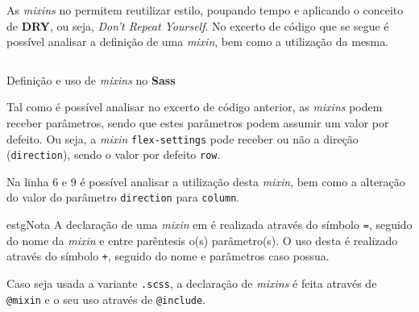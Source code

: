 
As \textit{mixins} no \textbf{} permitem reutilizar estilo, poupando tempo e aplicando o conceito de \textbf{DRY}, ou seja, \textit{Don't Repeat Yourself}. No excerto de código que se segue é possível analisar a definição de uma \textit{mixin}, bem como a utilização da mesma.

\begin{longlisting}
	\inputminted[highlightlines={6,9},highlightcolor=yellow!25]{sass}{code/sass/mixins.sass}
	\caption{Definição e uso de \textit{mixins} no \textbf{Sass}}
\end{longlisting}

Tal como é possível analisar no excerto de código anterior, as \textit{mixins} podem receber parâmetros, sendo que estes parâmetros podem assumir um valor por defeito. Ou seja, a \textit{mixin} \verb|flex-settings| pode receber ou não a direção (\verb|direction|), sendo o valor por defeito \texttt{row}.

Na linha 6 e 9 é possível analisar a utilização desta \textit{mixin}, bem como a alteração do valor do parâmetro \verb|direction| para \verb|column|.

\begin{mybox}{estg}{Nota}
	A declaração de uma \textit{mixin} em \textbf{} é realizada através do símbolo \verb|=|, seguido do nome da \textit{mixin} e entre parêntesis o(s) parâmetro(s). O uso desta é realizado através do símbolo \verb|+|, seguido do nome e parâmetros caso possua.

	Caso seja usada a variante \verb|.scss|, a declaração de \textit{mixins} é feita através de \verb|@mixin| e o seu uso através de \verb|@include|.
\end{mybox}